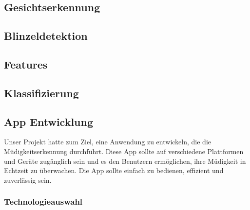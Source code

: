 \subsection{Gesichtserkennung}
\label{sec:facedetection}

\subsection{Blinzeldetektion}
\label{sec:blinkdetection}

\subsection{Features}
\label{sec:features}

\subsection{Klassifizierung}
\label{sec:classification}

\subsection{App Entwicklung}
\label{ssec:appEntwicklung}
	Unser Projekt hatte zum Ziel, eine Anwendung zu entwickeln, die die Müdigkeitserkennung durchführt. Diese App sollte auf verschiedene Plattformen und Geräte zugänglich sein und es den Benutzern ermöglichen, ihre Müdigkeit in Echtzeit zu überwachen. Die App sollte einfach zu bedienen, effizient und zuverlässig sein. 
	
	\subsubsection{Technologieauswahl}
	\label{sssec:technologie}
		
